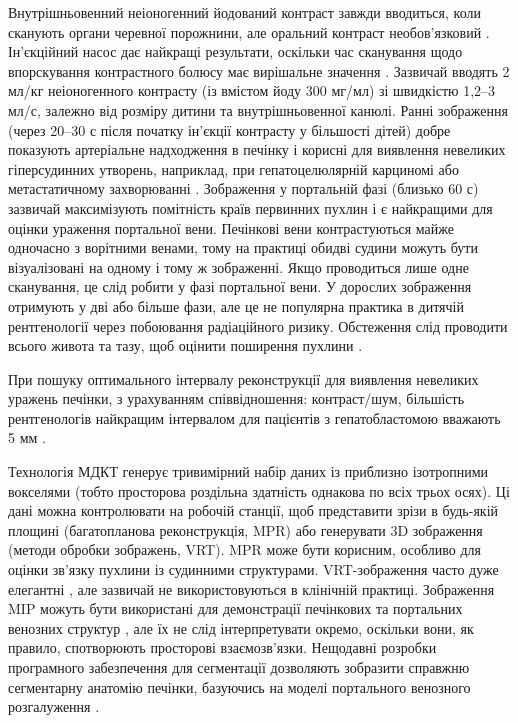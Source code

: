Внутрішньовенний неіоногенний йодований контраст завжди вводиться, коли сканують органи черевної порожнини, але оральний контраст необов’язковий \cite{pmid17208562}. Ін'єкційний насос дає найкращі результати, оскільки час сканування щодо впорскування контрастного болюсу має вирішальне значення \cite{pmid16794509}. Зазвичай вводять 2 мл/кг неіоногенного контрасту (із вмістом йоду 300 мг/мл) зі швидкістю 1,2–3 мл/с, залежно від розміру дитини та внутрішньовенної канюлі. Ранні зображення (через 20–30 с після початку ін’єкції контрасту у більшості дітей) добре показують артеріальне надходження в печінку і корисні для виявлення невеликих гіперсудинних утворень, наприклад, при гепатоцелюлярній карциномі або метастатичному захворюванні \cite{pmid17430157}. Зображення у портальній фазі (близько 60 с) зазвичай максимізують помітність країв первинних пухлин і є найкращими для оцінки ураження портальної вени. Печінкові вени контрастуються майже одночасно з ворітними венами, тому на практиці обидві судини можуть бути візуалізовані на одному і тому ж зображенні. Якщо проводиться лише одне сканування, це слід робити у фазі портальної вени. У дорослих зображення отримують у дві або більше фази, але це не популярна практика в дитячій рентгенології через побоювання радіаційного ризику. Обстеження слід проводити всього живота та тазу, щоб оцінити поширення пухлини \cite{pmid17208562}.

При пошуку оптимального інтервалу реконструкції для виявлення невеликих уражень печінки, з урахуванням співвідношення: контраст/шум, більшість рентгенологів  найкращим інтервалом для пацієнтів з гепатобластомою вважають 5 мм \cite{pmid17661341}.

Технологія МДКТ генерує тривимірний набір даних із приблизно ізотропними вокселями (тобто просторова роздільна здатність однакова по всіх трьох осях). Ці дані можна контролювати на робочій станції, щоб представити зрізи в будь-якій площині (багатопланова реконструкція, MPR) або генерувати 3D зображення (методи обробки зображень, VRT). MPR може бути корисним, особливо для оцінки зв'язку пухлини із судинними структурами. VRT-зображення часто дуже елегантні \cite{pmid18444949}, але зазвичай не використовуються в клінічній практиці. Зображення MIP можуть бути використані для демонстрації печінкових та портальних венозних структур \cite{pmid18560935}, але їх не слід інтерпретувати окремо, оскільки вони, як правило, спотворюють просторові взаємозв'язки. Нещодавні розробки програмного забезпечення для сегментації дозволяють зобразити справжню сегментарну анатомію печінки, базуючись на моделі портального венозного розгалуження \cite{pmid18970927}.

